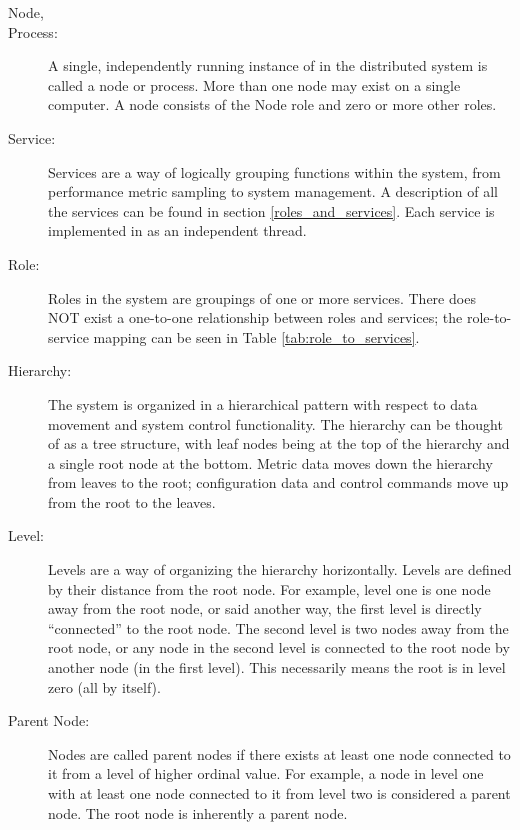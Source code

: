 \begin{description}
\item[\dcamp Node,]
\item[\dcamp Process:]
A single, independently running instance of \dcamp in the distributed system is called a \dcamp node or process. More
than one node may exist on a single computer. A node consists of the Node role and zero or more other \dcamp roles. 

\item[\dcamp Service:]
Services are a way of logically grouping functions within the \dcamp system, from performance metric sampling to \dcamp
system management. A description of all the \dcamp services can be found in section \ref{roles_and_services}. Each
service is implemented in \dcamp as an independent thread.

\item[\dcamp Role:]
Roles in the \dcamp system are groupings of one or more \dcamp services. There does NOT exist a one-to-one
relationship between roles and services; the \dcamp role-to-service mapping can be seen in Table
\ref{tab:role_to_services}.

\item[\dcamp Hierarchy:]
The \dcamp system is organized in a hierarchical pattern with respect to data movement and system control functionality.
The hierarchy can be thought of as a tree structure, with leaf nodes being at the top of the hierarchy and a single root
node at the bottom. Metric data moves down the hierarchy from leaves to the root; configuration data and control
commands move up from the root to the leaves. 

\item[\dcamp Level:]
Levels are a way of organizing the \dcamp hierarchy horizontally. Levels are defined by their distance from the root
node. For example, level one is one node away from the root node, or said another way, the first level is directly
``connected'' to the root node. The second level is two nodes away from the root node, or any node in the second level is
connected to the root node by another node (in the first level). This necessarily means the root is in level zero (all
by itself). 

\item[Parent Node:]
Nodes are called parent nodes if there exists at least one node connected to it from a level of higher ordinal value.
For example, a node in level one with at least one node connected to it from level two is considered a parent node. The
root node is inherently a parent node. 


\end{description}
